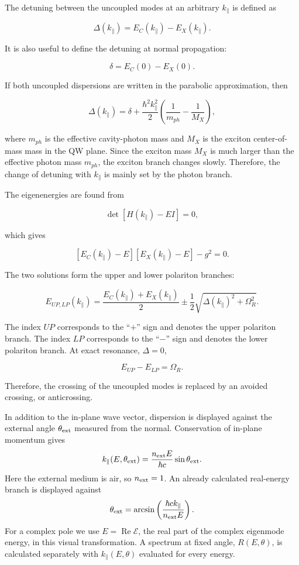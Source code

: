 \documentclass[12pt,a4paper]{article}
\begin{document}
The detuning between the uncoupled modes at an arbitrary $k_\parallel$ is defined as

\[
\Delta(k_\parallel)
=
E_C(k_\parallel)-E_X(k_\parallel).
\]

It is also useful to define the detuning at normal propagation:

\[
\delta
=
E_C(0)-E_X(0).
\]

If both uncoupled dispersions are written in the parabolic approximation, then

\[
\Delta(k_\parallel)
=
\delta
+
\frac{\hbar^2k_\parallel^2}{2}
\left(
\frac{1}{m_{ph}}-\frac{1}{M_X}
\right),
\]

where $m_{ph}$ is the effective cavity-photon mass and $M_X$ is the exciton center-of-mass mass in the QW plane. Since the exciton mass $M_X$ is much larger than the effective photon mass $m_{ph}$, the exciton branch changes slowly. Therefore, the change of detuning with $k_\parallel$ is mainly set by the photon branch.

The eigenenergies are found from

\[
\det\!\left[H(k_\parallel)-E I\right]=0,
\]

which gives

\[
\left[E_C(k_\parallel)-E\right]
\left[E_X(k_\parallel)-E\right]
-g^2=0.
\]

The two solutions form the upper and lower polariton branches:

\[
E_{UP,LP}(k_\parallel)
=
\frac{E_C(k_\parallel)+E_X(k_\parallel)}{2}
\pm
\frac12
\sqrt{\Delta(k_\parallel)^2+\Omega_R^2}.
\]

The index $UP$ corresponds to the ``$+$'' sign and denotes the upper polariton branch. The index $LP$ corresponds to the ``$-$'' sign and denotes the lower polariton branch. At exact resonance, $\Delta=0$,

\[
E_{UP}-E_{LP}=\Omega_R.
\]

Therefore, the crossing of the uncoupled modes is replaced by an avoided crossing, or anticrossing.


In addition to the in-plane wave vector, dispersion is displayed against the
external angle $\theta_{\rm ext}$ measured from the normal. Conservation of
in-plane momentum gives
\[
k_\parallel(E,\theta_{\rm ext})
=\frac{n_{\rm ext}E}{\hbar c}\sin\theta_{\rm ext}.
\]
Here the external medium is air, so $n_{\rm ext}=1$. An already calculated
real-energy branch is displayed against
\[
\theta_{\rm ext}=\arcsin\left(\frac{\hbar c k_\parallel}{n_{\rm ext}E}\right).
\]
For a complex pole we use $E=\operatorname{Re}\mathcal E$, the real part of
the complex eigenmode energy, in this visual transformation. A spectrum at
fixed angle, $R(E,\theta)$, is calculated separately with
$k_\parallel(E,\theta)$ evaluated for every energy.
\end{document}
